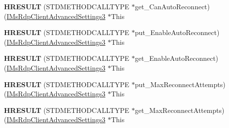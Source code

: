 \begin{DoxyCompactItemize}
{\bfseries H\+R\+E\+S\+U\+LT} (S\+T\+D\+M\+E\+T\+H\+O\+D\+C\+A\+L\+L\+T\+Y\+PE $\ast$get\+\_\+\+Can\+Auto\+Reconnect)(\hyperlink{interface_m_s_t_s_c_lib_1_1_i_ms_rdp_client_advanced_settings3}{I\+Ms\+Rdp\+Client\+Advanced\+Settings3} $\ast$This
\item 
\mbox{\label{struct_m_s_t_s_c_lib_1_1_i_ms_rdp_client_advanced_settings3_vtbl_ad78a8d17b626df37f450dfd61cb65664}} 
{\bfseries H\+R\+E\+S\+U\+LT} (S\+T\+D\+M\+E\+T\+H\+O\+D\+C\+A\+L\+L\+T\+Y\+PE $\ast$put\+\_\+\+Enable\+Auto\+Reconnect)(\hyperlink{interface_m_s_t_s_c_lib_1_1_i_ms_rdp_client_advanced_settings3}{I\+Ms\+Rdp\+Client\+Advanced\+Settings3} $\ast$This
\item 
\mbox{\label{struct_m_s_t_s_c_lib_1_1_i_ms_rdp_client_advanced_settings3_vtbl_a6f05eaf572866d3d30fde3b073434a98}} 
{\bfseries H\+R\+E\+S\+U\+LT} (S\+T\+D\+M\+E\+T\+H\+O\+D\+C\+A\+L\+L\+T\+Y\+PE $\ast$get\+\_\+\+Enable\+Auto\+Reconnect)(\hyperlink{interface_m_s_t_s_c_lib_1_1_i_ms_rdp_client_advanced_settings3}{I\+Ms\+Rdp\+Client\+Advanced\+Settings3} $\ast$This
\item 
\mbox{\label{struct_m_s_t_s_c_lib_1_1_i_ms_rdp_client_advanced_settings3_vtbl_a0c6655538502fcf47626d52b7ed8f5aa}} 
{\bfseries H\+R\+E\+S\+U\+LT} (S\+T\+D\+M\+E\+T\+H\+O\+D\+C\+A\+L\+L\+T\+Y\+PE $\ast$put\+\_\+\+Max\+Reconnect\+Attempts)(\hyperlink{interface_m_s_t_s_c_lib_1_1_i_ms_rdp_client_advanced_settings3}{I\+Ms\+Rdp\+Client\+Advanced\+Settings3} $\ast$This
\item 
\mbox{\label{struct_m_s_t_s_c_lib_1_1_i_ms_rdp_client_advanced_settings3_vtbl_a656745c45965e84c9754dc38029243b1}} 
{\bfseries H\+R\+E\+S\+U\+LT} (S\+T\+D\+M\+E\+T\+H\+O\+D\+C\+A\+L\+L\+T\+Y\+PE $\ast$get\+\_\+\+Max\+Reconnect\+Attempts)(\hyperlink{interface_m_s_t_s_c_lib_1_1_i_ms_rdp_client_advanced_settings3}{I\+Ms\+Rdp\+Client\+Advanced\+Settings3} $\ast$This
\item 
\mbox{\label{struct_m_s_t_s_c_lib_1_1_i_ms_rdp_client_advanced_settings3_vtbl_aa67aee29e72a60dbc27ee87f4e438e74}} 

\end{DoxyCompactItemize}
